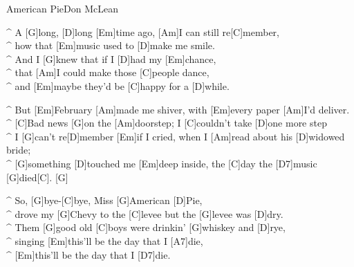 \begin{song}{American Pie}{Don McLean}

\begin{guitar}
^ A [G]long, [D]long [Em]time ago, [Am]I can still re[C]member, \\
^ how that [Em]music used to [D]make me smile.\\
^ And I [G]knew that if I [D]had my [Em]chance, \\
^ that [Am]I could make those [C]people dance,\\
^ and [Em]maybe they'd be [C]happy for a [D]while.\\
\end{guitar}

\begin{guitar}
^ But [Em]February [Am]made me shiver, with [Em]every paper [Am]I'd deliver.  \\
^ [C]Bad news [G]on the [Am]doorstep; I [C]couldn't take [D]one more step  \\
^ I [G]can't re[D]member [Em]if I cried, when I [Am]read about his [D]widowed bride;\\
^ [G]something [D]touched me [Em]deep inside, the [C]day the [D7]music [G]died[C]. [G]\\
\end{guitar}

\begin{guitar}
^ So, [G]bye-[C]bye, Miss [G]American [D]Pie, \\
^ drove my [G]Chevy to the [C]levee but the [G]levee was [D]dry. \\
^ Them [G]good old [C]boys were drinkin' [G]whiskey and [D]rye, \\
^ singing [Em]this'll be the day that I [A7]die, \\
^ [Em]this'll be the day that I [D7]die.\\
\end{guitar}


\end{song}
